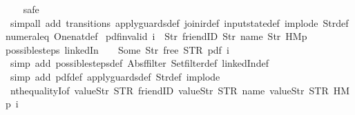 \begin{isabellebody}
\ \ \isamarkupfalse%
\ safe\isanewline
\ \ \isamarkupfalse%
\ {\isacharparenleft}simp{\isacharunderscore}all\ add{\isacharcolon}\ transitions\ apply{\isacharunderscore}guards{\isacharunderscore}def\ join{\isacharunderscore}ir{\isacharunderscore}def\ input{}state{\isacharunderscore}def\ implode\ Str{\isacharunderscore}def\ numeral{\isacharunderscore}{}{\isacharunderscore}eq{\isacharunderscore}{}\ One{\isacharunderscore}nat{\isacharunderscore}def{\isacharparenright}%
\endisatagproof
{\isafoldproof}%
%
\isadelimproof
\isanewline
%
\endisadelimproof
\isanewline
{}\isamarkupfalse%
\ pdf{\isacharunderscore}{}{\isacharunderscore}invalid{\isacharcolon}\ {\isachardoublequoteopen}i\ {\isasymnoteq}\ {\isacharbrackleft}Str\ {\isacharprime}{\isacharprime}friendID{\isacharprime}{\isacharprime}{\isacharcomma}\ Str\ {\isacharprime}{\isacharprime}name{\isacharprime}{\isacharprime}{\isacharcomma}\ Str\ {\isacharprime}{\isacharprime}HM{}p{\isacharprime}{\isacharprime}{\isacharbrackright}\ {\isasymLongrightarrow}\isanewline
possible{\isacharunderscore}steps\ linkedIn\ {}\ {\isacharparenleft}{\isacharless}{\isachargreater}{\isacharparenleft}{}\ {\isachardollar}{\isacharcolon}{\isacharequal}\ Some\ {\isacharparenleft}Str\ {\isacharprime}{\isacharprime}free{\isacharprime}{\isacharprime}{\isacharparenright}{\isacharparenright}{\isacharparenright}\ STR\ {\isacharprime}{\isacharprime}pdf{\isacharprime}{\isacharprime}\ i\ {\isacharequal}\ {\isacharbraceleft}{\isacharbar}{\isacharbar}{\isacharbraceright}{\isachardoublequoteclose}\isanewline
%
\isadelimproof
\ \ %
\endisadelimproof
%
\isatagproof
{}\isamarkupfalse%
\ {\isacharparenleft}simp\ add{\isacharcolon}\ possible{\isacharunderscore}steps{\isacharunderscore}def\ Abs{\isacharunderscore}ffilter\ Set{\isachardot}filter{\isacharunderscore}def\ linkedIn{\isacharunderscore}def{\isacharparenright}\isanewline
\ \ \isamarkupfalse%
\ {\isacharparenleft}simp\ add{\isacharcolon}\ pdf{\isacharunderscore}def\ apply{\isacharunderscore}guards{\isacharunderscore}def\ Str{\isacharunderscore}def\ implode{\isacharparenright}\isanewline
\ \ \isamarkupfalse%
\ nth{\isacharunderscore}equalityI{\isacharbrackleft}of\ {\isachardoublequoteopen}{\isacharbrackleft}value{\isachardot}Str\ STR\ {\isacharprime}{\isacharprime}friendID{\isacharprime}{\isacharprime}{\isacharcomma}\ value{\isachardot}Str\ STR\ {\isacharprime}{\isacharprime}name{\isacharprime}{\isacharprime}{\isacharcomma}\ value{\isachardot}Str\ STR\ {\isacharprime}{\isacharprime}HM{}p{\isacharprime}{\isacharprime}{\isacharbrackright}{\isachardoublequoteclose}\ i{\isacharbrackright}\isanewline

\end{isabellebody}
